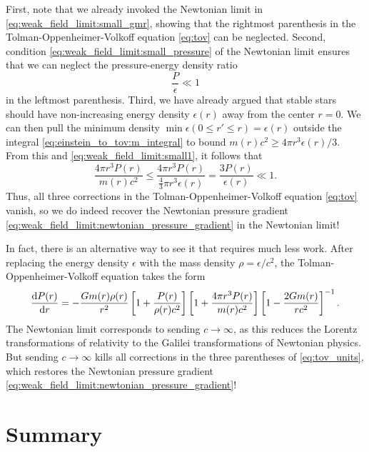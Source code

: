 First, note that we already invoked the Newtonian limit in \cref{eq:weak_field_limit:small_gmr}, showing that the rightmost parenthesis in the Tolman-Oppenheimer-Volkoff equation \eqref{eq:tov} can be neglected.
Second, condition \eqref{eq:weak_field_limit:small_pressure} of the Newtonian limit ensures that we can neglect the pressure-energy density ratio
\begin{equation}
	\frac{P}{\epsilon} \ll 1
	\label{eq:weak_field_limit:small1}
\end{equation}
in the leftmost parenthesis.
Third, we have already argued that stable stars should have non-increasing energy density $\epsilon(r)$ away from the center $r=0$.
We can then pull the minimum density $\min \epsilon(0 \leq r' \leq r) = \epsilon(r)$ outside the integral \eqref{eq:einstein_to_tov:m_integral} to bound $m(r) c^2 \geq 4 \pi r^3 \epsilon(r) / 3$.
From this and \cref{eq:weak_field_limit:small1}, it follows that
\begin{equation}
	\frac{4 \pi r^3 P(r)}{m(r) c^2} \leq \frac{4 \pi r^3 P(r)}{\frac{4}{3} \pi r^3 \epsilon(r)}
	                                =    \frac{3 P(r)}{\epsilon(r)}
						            \ll  1 .
	\label{eq:weak_field_limit:small2}
\end{equation}
Thus, all three corrections in the Tolman-Oppenheimer-Volkoff equation \eqref{eq:tov} vanish, so we do indeed recover the Newtonian pressure gradient \eqref{eq:weak_field_limit:newtonian_pressure_gradient} in the Newtonian limit!

In fact, there is an alternative way to see it that requires much less work.
After replacing the energy density $\epsilon$ with the mass density $\rho = \epsilon / c^2$, the Tolman-Oppenheimer-Volkoff equation takes the form
\begin{equation}
	\odv{P(r)}{r} = -\frac{G m(r) \rho(r)}{r^2} \left[ 1 + \frac{P(r)}{\rho(r) c^2} \right] \left[ 1 + \frac{4 \pi r^3 P(r)}{m(r) c^2} \right] \left[ 1 - \frac{2 G m(r)}{r c^2} \right]^{-1} .
	\label{eq:tov_units}
\end{equation}
The Newtonian limit corresponds to sending $c \rightarrow \infty$, as this reduces the Lorentz transformations of relativity to the Galilei transformations of Newtonian physics.
But sending $c \rightarrow \infty$ kills all corrections in the three parentheses of \cref{eq:tov_units}, which restores the Newtonian pressure gradient \eqref{eq:weak_field_limit:newtonian_pressure_gradient}!


\section{Summary}

